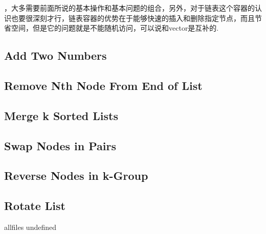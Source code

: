 \documentclass{article}
\begin{document}
\begin{CJK}{UTF8}{gbsn}     %

\else
    
，大多需要前面所说的基本操作和基本问题的组合，另外，对于链表这个容器的认识也要很深刻才行，链表容器的优势在于能够快速的插入和删除指定节点，而且节省空间，但是它的问题就是不能随机访问，可以说和vector是互补的.
\subsection{Add Two Numbers}

\subsection{Remove Nth Node From End of List}

\subsection{Merge k Sorted Lists}

\subsection{Swap Nodes in Pairs}

\subsection{Reverse Nodes in k-Group}

\subsection{Rotate List}


\fi

\ifx allfiles undefined
\end{CJK}
\end{document}
